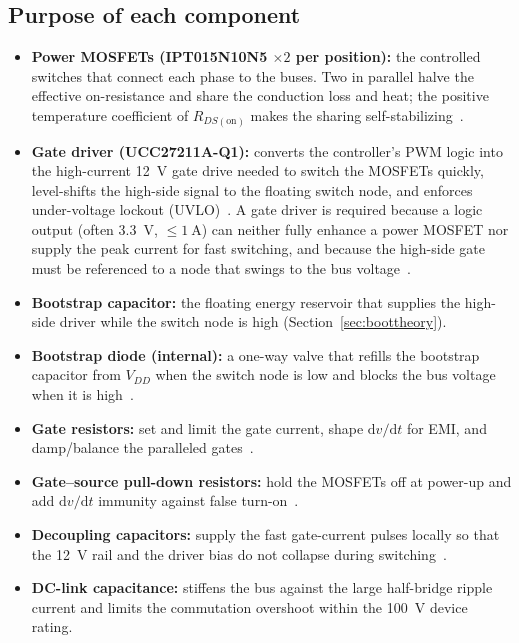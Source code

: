 \documentclass[journal,onecolumn,11pt]{IEEEtran}
\newcommand{\Rdson}{R_{DS(\mathrm{on})}}
\begin{document}
\subsection{Purpose of each component}
\begin{itemize}[leftmargin=1.4em]
  \item \textbf{Power MOSFETs (IPT015N10N5 $\times2$ per position):} the controlled switches that
        connect each phase to the buses. Two in parallel halve the effective on-resistance and
        share the conduction loss and heat; the positive temperature coefficient of $\Rdson$ makes
        the sharing self-stabilizing~\cite{balogh}.
  \item \textbf{Gate driver (UCC27211A-Q1):} converts the controller's PWM logic into the
        high-current \SI{12}{\volt} gate drive needed to switch the MOSFETs quickly, level-shifts
        the high-side signal to the floating switch node, and enforces under-voltage lockout
        (UVLO)~\cite{ucc27211}. A gate driver is required because a logic output (often
        \SI{3.3}{\volt}, $\le\SI{1}{\ampere}$) can neither fully enhance a power MOSFET nor supply
        the peak current for fast switching, and because the high-side gate must be referenced to a
        node that swings to the bus voltage~\cite{ucc27211,balogh}.
  \item \textbf{Bootstrap capacitor:} the floating energy reservoir that supplies the high-side
        driver while the switch node is high (Section~\ref{sec:boottheory}).
  \item \textbf{Bootstrap diode (internal):} a one-way valve that refills the bootstrap capacitor
        from $V_{DD}$ when the switch node is low and blocks the bus voltage when it is
        high~\cite{ucc27211,ir_an978}.
  \item \textbf{Gate resistors:} set and limit the gate current, shape $\mathrm{d}v/\mathrm{d}t$
        for EMI, and damp/balance the paralleled gates~\cite{balogh}.
  \item \textbf{Gate--source pull-down resistors:} hold the MOSFETs off at power-up and add
        $\mathrm{d}v/\mathrm{d}t$ immunity against false turn-on~\cite{balogh}.
  \item \textbf{Decoupling capacitors:} supply the fast gate-current pulses locally so that the
        \SI{12}{\volt} rail and the driver bias do not collapse during switching~\cite{ucc27211}.
  \item \textbf{DC-link capacitance:} stiffens the bus against the large half-bridge ripple current
        and limits the commutation overshoot within the \SI{100}{\volt} device rating.
\end{itemize}
\end{document}
